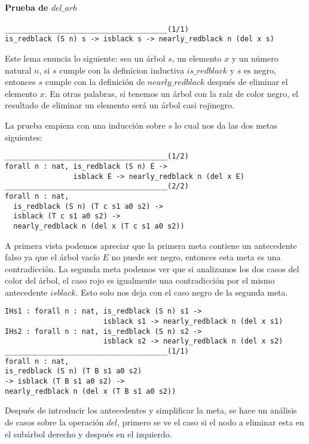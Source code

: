 \paragraph{Prueba de \hyperref[lema_6]{$del\_arb$}}

\begin{verbatim}
______________________________________(1/1)
is_redblack (S n) s -> isblack s -> nearly_redblack n (del x s)
\end{verbatim}

Este lema enuncia lo siguiente: sea un \'arbol $s$, un elemento $x$ y un n\'umero natural $n$, si
$s$ cumple con la definicion inductiva \hyperref[inductive_isRedB]{$is\_redblack$} y $s$ es negro, 
entonces $s$ cumple con la definición de \hyperref[inductive_isRedB]{$nearly\_redblack$} después de 
eliminar el elemento $x$. En otras palabras, si tenemos un \'arbol con la raíz de color negro, el 
resultado de eliminar un elemento ser\'a un \'arbol casi rojinegro.

La prueba empieza con una inducci\'on sobre $s$ lo cual nos da las dos metas siguientes:
\begin{verbatim}
______________________________________(1/2)
forall n : nat, is_redblack (S n) E ->
                isblack E -> nearly_redblack n (del x E)
______________________________________(2/2)
forall n : nat,
  is_redblack (S n) (T c s1 a0 s2) ->
  isblack (T c s1 a0 s2) ->
  nearly_redblack n (del x (T c s1 a0 s2))
\end{verbatim}

A primera vista podemos apreciar que la primera meta contiene un antecedente falso ya que el \'arbol
vacío $E$ no puede ser negro, entonces esta meta es una contradicci\'on. La segunda meta podemos
ver que si analizamos los dos casos del color del \'arbol, el caso rojo es igualmente una
contradicci\'on por el mismo antecedente $isblack$. Esto solo nos deja con el caso negro de la
segunda meta.

\begin{verbatim}
IHs1 : forall n : nat, is_redblack (S n) s1 ->
                       isblack s1 -> nearly_redblack n (del x s1)
IHs2 : forall n : nat, is_redblack (S n) s2 ->
                       isblack s2 -> nearly_redblack n (del x s2)
______________________________________(1/1)
forall n : nat,
is_redblack (S n) (T B s1 a0 s2)
-> isblack (T B s1 a0 s2) ->
nearly_redblack n (del x (T B s1 a0 s2))
\end{verbatim}

Después de introducir los antecedentes y simplificar la meta, se hace un análisis de casos sobre la
operaci\'on \hyperref[func_del]{$del$}, primero se ve el caso si el nodo a eliminar esta en el 
subárbol derecho y después en el izquierdo.

